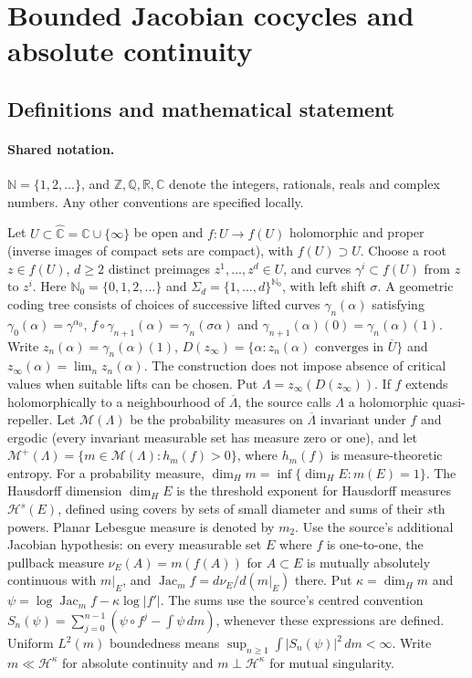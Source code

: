 \documentclass[11pt]{article}
\begin{document}
\section{Bounded Jacobian cocycles and absolute continuity}\label{statement}

\subsection{Definitions and mathematical statement}

\paragraph{Shared notation.}$\mathbb N=\{1,2,\ldots\}$, and $\mathbb Z,\mathbb Q,\mathbb R,\mathbb C$ denote the integers, rationals, reals and complex numbers. Any other conventions are specified locally.


Let $U\subset\widehat{\mathbb C}=\mathbb C\cup\{\infty\}$ be open and $f:U\to f(U)$ holomorphic and proper (inverse images of compact sets are compact), with $f(U)\supset U$. Choose a root $z\in f(U)$, $d\geq2$ distinct preimages $z^1,\ldots,z^d\in U$, and curves $\gamma^i\subset f(U)$ from $z$ to $z^i$. Here $\mathbb N_0=\{0,1,2,\ldots\}$ and $\Sigma_d=\{1,\ldots,d\}^{\mathbb N_0}$, with left shift $\sigma$. A geometric coding tree consists of choices of successive lifted curves $\gamma_n(\alpha)$ satisfying $\gamma_0(\alpha)=\gamma^{\alpha_0}$, $f\circ\gamma_{n+1}(\alpha)=\gamma_n(\sigma\alpha)$ and $\gamma_{n+1}(\alpha)(0)=\gamma_n(\alpha)(1)$. Write $z_n(\alpha)=\gamma_n(\alpha)(1)$, $D(z_\infty)=\{\alpha:z_n(\alpha)\text{ converges in }\overline U\}$ and $z_\infty(\alpha)=\lim_n z_n(\alpha)$. The construction does not impose absence of critical values when suitable lifts can be chosen. Put $\Lambda=z_\infty(D(z_\infty))$. If $f$ extends holomorphically to a neighbourhood of $\overline\Lambda$, the source calls $\Lambda$ a holomorphic quasi-repeller. Let $\mathcal M(\Lambda)$ be the probability measures on $\overline\Lambda$ invariant under $f$ and ergodic (every invariant measurable set has measure zero or one), and let $\mathcal M^+(\Lambda)=\{m\in\mathcal M(\Lambda):h_m(f)>0\}$, where $h_m(f)$ is measure-theoretic entropy. For a probability measure, $\dim_Hm=\inf\{\dim_HE:m(E)=1\}$. The Hausdorff dimension $\dim_H E$ is the threshold exponent for Hausdorff measures $\mathcal H^s(E)$, defined using covers by sets of small diameter and sums of their $s$th powers. Planar Lebesgue measure is denoted by $m_2$. Use the source's additional Jacobian hypothesis: on every measurable set $E$ where $f$ is one-to-one, the pullback measure $\nu_E(A)=m(f(A))$ for $A\subset E$ is mutually absolutely continuous with $m|_E$, and $\operatorname{Jac}_m f=d\nu_E/d(m|_E)$ there. Put $\kappa=\dim_Hm$ and $\psi=\log\operatorname{Jac}_mf-\kappa\log|f'|$. The sums use the source's centred convention $S_n(\psi)=\sum_{j=0}^{n-1}(\psi\circ f^j-\int\psi\,dm)$, whenever these expressions are defined. Uniform $L^2(m)$ boundedness means $\sup_{n\geq1}\int|S_n(\psi)|^2\,dm<\infty$. Write $m\ll\mathcal H^\kappa$ for absolute continuity and $m\perp\mathcal H^\kappa$ for mutual singularity.
\end{document}
